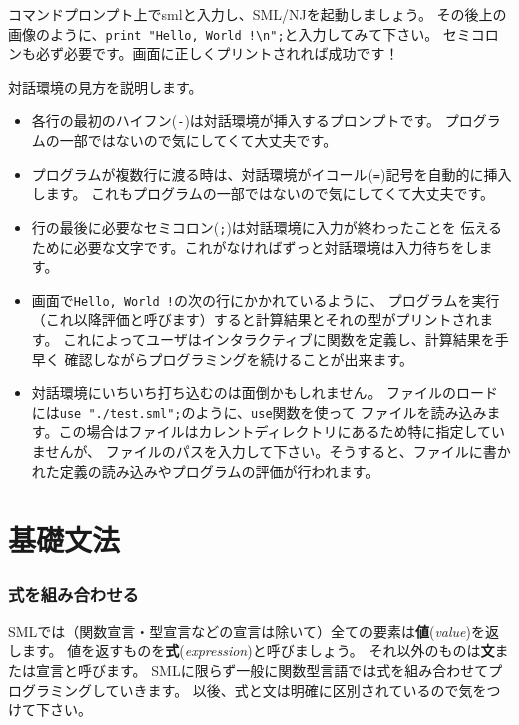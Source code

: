 \documentclass[11pt,a4paper]{article}
\begin{document}
コマンドプロンプト上でsmlと入力し、SML/NJを起動しましょう。
その後上の画像のように、\lstinline{print "Hello, World !\n";}と入力してみて下さい。
セミコロンも必ず必要です。画面に正しくプリントされれば成功です！

対話環境の見方を説明します。
\begin{itemize}
\item 各行の最初のハイフン(\lstinline{-})は対話環境が挿入するプロンプトです。
  プログラムの一部ではないので気にしてくて大丈夫です。
\item プログラムが複数行に渡る時は、対話環境がイコール(\lstinline{=})記号を自動的に挿入します。
  これもプログラムの一部ではないので気にしてくて大丈夫です。
\item 行の最後に必要なセミコロン(\lstinline{;})は対話環境に入力が終わったことを
  伝えるために必要な文字です。これがなければずっと対話環境は入力待ちをします。
\item 画面で\lstinline{Hello, World !}の次の行にかかれているように、
  プログラムを実行（これ以降評価と呼びます）すると計算結果とそれの型がプリントされます。
  これによってユーザはインタラクティブに関数を定義し、計算結果を手早く
  確認しながらプログラミングを続けることが出来ます。
\item 対話環境にいちいち打ち込むのは面倒かもしれません。
  ファイルのロードには\lstinline{use "./test.sml";}のように、\lstinline{use}関数を使って
  ファイルを読み込みます。この場合はファイルはカレントディレクトリにあるため特に指定していませんが、
  ファイルのパスを入力して下さい。そうすると、ファイルに書かれた定義の読み込みやプログラムの評価が行われます。
\end{itemize}

\part{基礎文法}

\section{式を組み合わせる}

SMLでは（関数宣言・型宣言などの宣言は除いて）全ての要素は{\bfseries 値}({\itshape value})を返します。
値を返すものを{\bfseries 式}({\itshape expression})と呼びましょう。
それ以外のものは{\bfseries 文}または宣言と呼びます。
SMLに限らず一般に関数型言語では式を組み合わせてプログラミングしていきます。
以後、式と文は明確に区別されているので気をつけて下さい。
\end{document}
